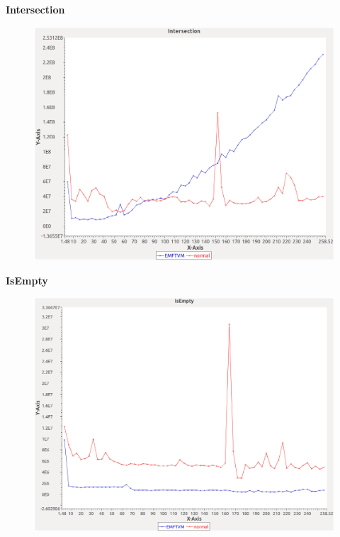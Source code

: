 \noindent\textbf{Intersection}

\begin{figure}[h]
\centering
\includegraphics[width=\textwidth]{../graphs/set/Intersection}
\end{figure}
\pagebreak

\noindent\textbf{IsEmpty}

\begin{figure}[h]
\centering
\includegraphics[width=\textwidth]{../graphs/set/IsEmpty}
\end{figure}
\pagebreak

